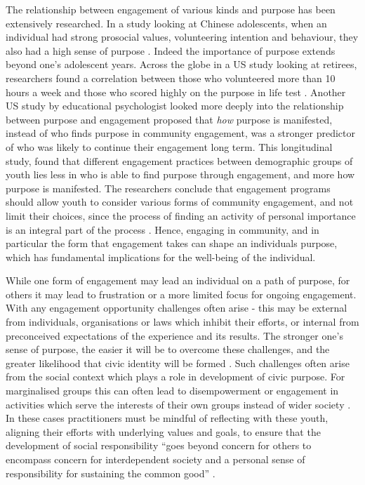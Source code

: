 The relationship between engagement of various kinds and purpose has been extensively researched. In a study looking at Chinese adolescents, when an individual had strong prosocial values, volunteering intention and behaviour, they also had a high sense of purpose \citep{Law2009}. Indeed the importance of purpose extends beyond one's adolescent years. Across the globe in a US study looking at retirees, researchers found a correlation between those who volunteered more than 10 hours a week and those who scored highly on the purpose in life test \citep{Weinstein1995}. Another US study by educational psychologist \citet{Barber2013} looked more deeply into the relationship between purpose and engagement proposed that \textit{how} purpose is manifested, instead of who finds purpose in community engagement, was a stronger predictor of who was likely to continue their engagement long term. This longitudinal study, found that different engagement practices between demographic groups of youth lies less in who is able to find purpose through engagement, and more how purpose is manifested. The researchers conclude that engagement programs should allow youth to consider various forms of community engagement, and not limit their choices, since the process of finding an activity of personal importance is an integral part of the process \citep{Barber2013}. Hence, engaging in community, and in particular the form that engagement takes can shape an individuals purpose, which has fundamental implications for the well-being of the individual. 

While one form of engagement may lead an individual on a path of purpose, for others it may lead to frustration or a more limited focus for ongoing engagement. With any engagement opportunity challenges often arise - this may be external from individuals, organisations or laws which inhibit their efforts, or internal from preconceived expectations of the experience and its results. The stronger one's sense of purpose, the easier it will be to overcome these challenges, and the greater likelihood that civic identity will be formed \citep{Malin2015}. Such challenges often arise from the social context which plays a role in development of civic purpose. For marginalised groups this can often lead to disempowerment or engagement in activities which serve the interests of their own groups instead of wider society \citep{Malin2015}. In these cases practitioners must be mindful of reflecting with these youth, aligning their efforts with underlying values and goals, to ensure that the development of social responsibility “goes beyond concern for others to encompass concern for interdependent society and a personal sense of responsibility for sustaining the common good” \citep[][p110]{Malin2015}. 

